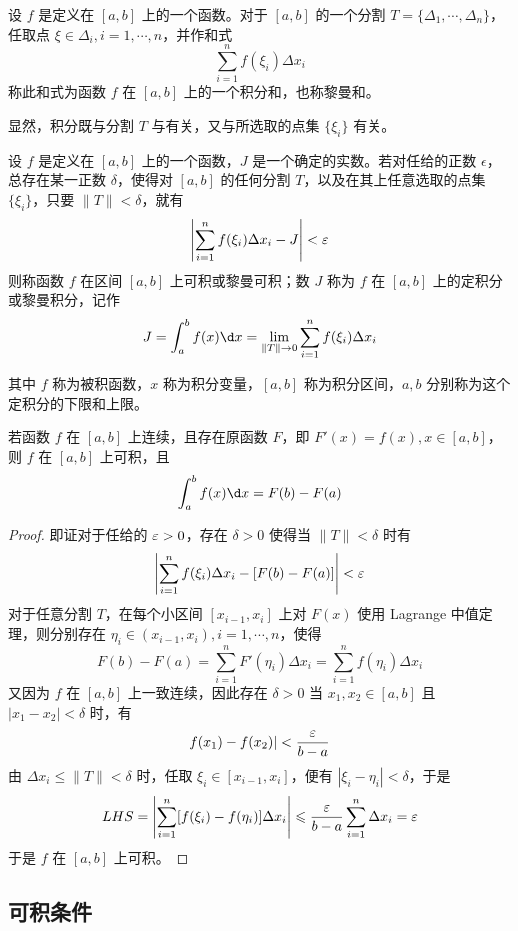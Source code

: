 \begin{definition}
    设 $f$ 是定义在 $[a,b]$ 上的一个函数。对于 $[a,b]$ 的一个分割 $T=\{\Delta_1,\cdots,\Delta_n\}$，任取点 $\xi\in\Delta_i,i=1,\cdots,n$，并作和式
    $$\sum_{i=1}^nf(\xi_i)\Delta x_i$$
    称此和式为函数 $f$ 在 $[a,b]$ 上的一个积分和，也称黎曼和。
\end{definition}

显然，积分既与分割 $T$ 与有关，又与所选取的点集 $\{\xi_i\}$ 有关。

\begin{definition}
    设 $f$ 是定义在 $[a,b]$ 上的一个函数，$J$ 是一个确定的实数。若对任给的正数 $\epsilon$，总存在某一正数 $\delta$，使得对 $[a,b]$ 的任何分割 $T$，以及在其上任意选取的点集 $\{\xi_i\}$，只要 $\| T \| < \delta$，就有
    $$\left| \sum_{i=1}^nf(\xi_i)\Delta x_i - J \right| < \varepsilon$$
    则称函数 $f$ 在区间 $[a,b]$ 上可积或黎曼可积；数 $J$ 称为 $f$ 在 $[a,b]$ 上的定积分或黎曼积分，记作
    $$J = \int_a^b f(x) \d x = \lim_{\| T \| \to 0} \sum_{i=1}^nf(\xi_i)\Delta x_i$$
\end{definition}

其中 $f$ 称为被积函数，$x$ 称为积分变量，$[a,b]$ 称为积分区间，$a,b$ 分别称为这个定积分的下限和上限。

\begin{theorem}
    若函数 $f$ 在 $[a,b]$ 上连续，且存在原函数 $F$，即 $F'(x) = f(x), x\in[a,b]$，则 $f$ 在 $[a,b]$ 上可积，且
    $$\int_a^bf(x)\d x = F(b) - F(a)$$
\end{theorem}

\begin{proof}
    即证对于任给的 $\varepsilon > 0$，存在 $\delta>0$ 使得当 $\| T \| < \delta$ 时有
    $$\left| \sum_{i=1}^nf(\xi_i)\Delta x_i - [F(b)-F(a)] \right| < \varepsilon$$
    对于任意分割 $T$，在每个小区间 $[x_{i-1},x_i]$ 上对 $F(x)$ 使用 Lagrange 中值定理，则分别存在 $\eta_i \in (x_{i-1},x_i),i=1,\cdots,n$，使得
    $$F(b)-F(a) = \sum_{i=1}^n F'(\eta_i)\Delta x_i = \sum_{i=1}^nf(\eta_i)\Delta x_i$$
    又因为 $f$ 在 $[a,b]$ 上一致连续，因此存在 $\delta > 0$ 当 $x_1,x_2\in[a,b]$ 且 $|x_1-x_2| < \delta$ 时，有
    $$f(x_1) - f(x_2)| < \frac{\varepsilon}{b-a}$$
    由 $\Delta x_i \leqslant \| T \| < \delta$ 时，任取 $\xi_i \in [x_{i-1},x_i]$，便有 $|\xi_i-\eta_i|<\delta$，于是
    $$LHS = \left| \sum_{i=1}^n [f(\xi_i)-f(\eta_i)]\Delta x_i \right| \leqslant \frac{\varepsilon}{b-a}\sum_{i=1}^n\Delta x_i = \varepsilon$$
    于是 $f$ 在 $[a,b]$ 上可积。
\end{proof}

\subsection{可积条件}

